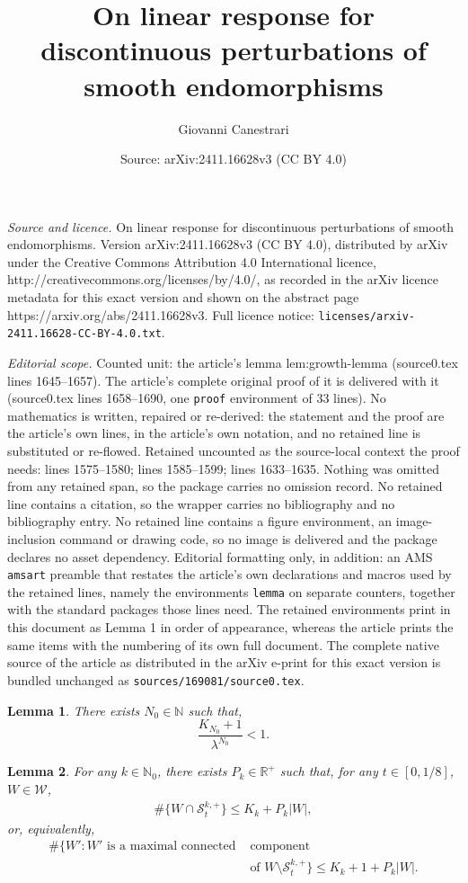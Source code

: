 \documentclass[10pt,a4paper]{amsart}
\title{On linear response for discontinuous perturbations of smooth endomorphisms}
\author{Giovanni Canestrari}
\date{Source: arXiv:2411.16628v3 (CC BY 4.0)}
\newtheorem{lemma}{Lemma}
\newcommand\bN{{\mathbb N}}
\newcommand\bR{{\mathbb R}}
\newcommand\cS{{\mathcal S}}
\newcommand\cW{{\mathcal W}}
\renewcommand{\le}{\leqslant}
\begin{document}
\maketitle

\noindent\emph{Source and licence.} On linear response for discontinuous perturbations of smooth endomorphisms. Version arXiv:2411.16628v3 (CC BY 4.0), distributed by arXiv under the Creative Commons Attribution 4.0 International licence, http://creativecommons.org/licenses/by/4.0/, as recorded in the arXiv licence metadata for this exact version and shown on the abstract page https://arxiv.org/abs/2411.16628v3. Full licence notice: \texttt{licenses/arxiv-2411.16628-CC-BY-4.0.txt}.\par\smallskip

\noindent\textit{Editorial scope.} Counted unit: the article's lemma lem:growth-lemma (source0.tex lines 1645--1657). The article's complete original proof of it is delivered with it (source0.tex lines 1658--1690, one \texttt{proof} environment of 33 lines). No mathematics is written, repaired or re-derived: the statement and the proof are the article's own lines, in the article's own notation, and no retained line is substituted or re-flowed.  Retained uncounted as the source-local context the proof needs: lines 1575--1580; lines 1585--1599; lines 1633--1635.  Nothing was omitted from any retained span, so the package carries no omission record.  No retained line contains a citation, so the wrapper carries no bibliography and no bibliography entry.  No retained line contains a figure environment, an image-inclusion command or drawing code, so no image is delivered and the package declares no asset dependency.  Editorial formatting only, in addition: an AMS \texttt{amsart} preamble that restates the article's own declarations and macros used by the retained lines, namely the environments \texttt{lemma} on separate counters, together with the standard packages those lines need.  The retained environments print in this document as Lemma 1 in order of appearance, whereas the article prints the same items with the numbering of its own full document.  The complete native source of the article as distributed in the arXiv e-print for this exact version is bundled unchanged as \texttt{sources/169081/source0.tex}.
\begin{lemma}\label{lem:hyp-beats-cutting}
  There exists \(N_0 \in \bN\) such that,
  \[
       \frac{K_{N_0} +1}{\lambda^{N_0}} < 1.
  \]
\end{lemma}

\begin{lemma}\label{lem:trasversality2}
  For any \(k \in \bN_0\), there exists \(P_k \in \bR^+\) such that, for any \(t \in [0,1/8]\), \(W \in \cW\),
  \[
  \begin{split}
    \#\{W \cap \cS_t^{k,+}\} \le K_{k} + P_{k}|W|,
  \end{split}
  \]
  or, equivalently,
  \[
  \begin{split}
\# \{W': W' \text{ is a maximal connected}& \text{ component} \\
&\text{ of }W \setminus \cS_t^{k,+}\} \le K_{k}+1 + P_k |W|.
  \end{split}
  \]
\end{lemma}
\end{document}
